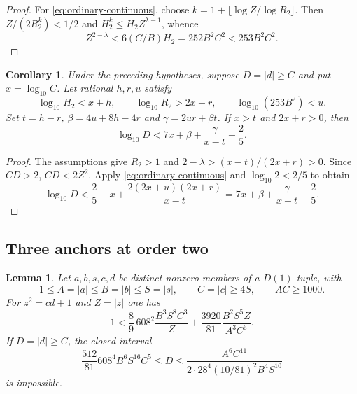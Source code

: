 \documentclass[12pt]{article}
\newtheorem{lemma}[theorem]{Lemma}
\newtheorem{corollary}[theorem]{Corollary}
\numberwithin{equation}{section}
\begin{document}
\begin{proof}
For \eqref{eq:ordinary-continuous}, choose
$k=1+\lfloor\log Z/\log R_2\rfloor$.  Then
$Z/(2R_2^k)<1/2$ and $H_2^k\le H_2Z^{\lambda-1}$, whence
\[
 Z^{2-\lambda}<6(C/B)H_2=252B^2C^2<253B^2C^2.
\]
\end{proof}

\begin{corollary}\label{cor:ordinary-height-envelope}
Under the preceding hypotheses, suppose $D=|d|\ge C$ and put
$x=\log_{10}C$.  Let rational $h,r,u$ satisfy
\[
 \log_{10}H_2<x+h,\qquad
 \log_{10}R_2>2x+r,\qquad
 \log_{10}(253B^2)<u.
\]
Set $t=h-r$, $\beta=4u+8h-4r$ and $\gamma=2ur+\beta t$.
If $x>t$ and $2x+r>0$, then
\[
 \log_{10}D<7x+\beta+\frac\gamma{x-t}+\frac25.
\]
\end{corollary}

\begin{proof}
The assumptions give $R_2>1$ and
$2-\lambda>(x-t)/(2x+r)>0$.  Since $CD>2$,
$CD<2Z^2$.  Apply \eqref{eq:ordinary-continuous} and
$\log_{10}2<2/5$ to obtain
\[
 \log_{10}D<\frac25-x+
       \frac{2(2x+u)(2x+r)}{x-t}
       =7x+\beta+\frac\gamma{x-t}+\frac25.
\]
\end{proof}

\subsection{Three anchors at order two}

\begin{lemma}\label{lem:ordinary-three-normalized}
Let $a,b,s,c,d$ be distinct nonzero members of a $D(1)$-tuple, with
\[
 1\le A=|a|\le B=|b|\le S=|s|,\qquad
 C=|c|\ge4S,\qquad AC\ge1000.
\]
For $z^2=cd+1$ and $Z=|z|$ one has
\begin{equation}\label{eq:ordinary-three-M}
 1<\frac89\,608^2\frac{B^3S^8C^3}{Z}
       +\frac{3920}{81}\frac{B^2S^5Z}{A^3C^6}.
\end{equation}
If $D=|d|\ge C$, the closed interval
\begin{equation}\label{eq:ordinary-three-coarse-window}
 \frac{512}{81}608^4B^6S^{16}C^5\le D\le
 \frac{A^6C^{11}}{2\cdot28^4(10/81)^2B^4S^{10}}
\end{equation}
is impossible.
\end{lemma}
\end{document}
